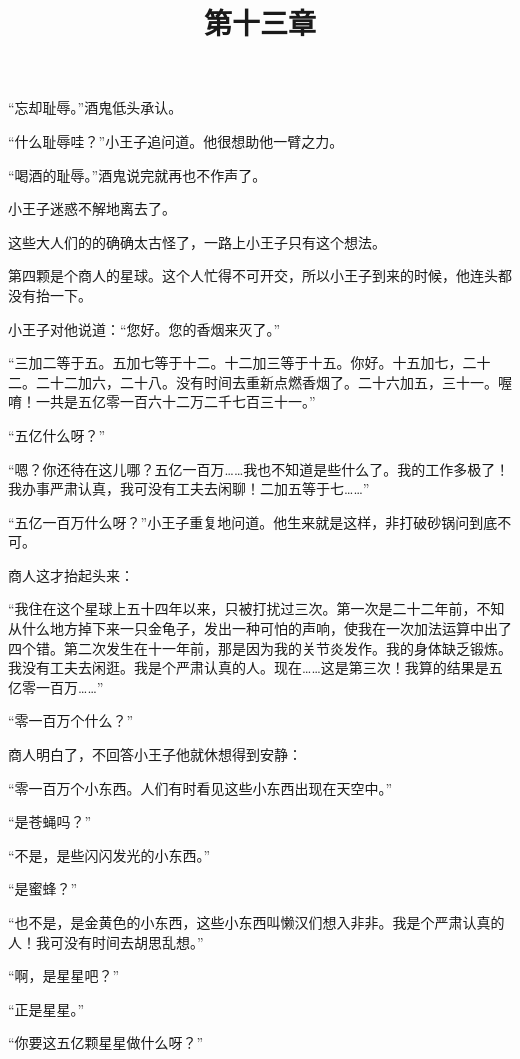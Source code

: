 “忘却耻辱。”酒鬼低头承认。

“什么耻辱哇？”小王子追问道。他很想助他一臂之力。

“喝酒的耻辱。”酒鬼说完就再也不作声了。

小王子迷惑不解地离去了。

这些大人们的的确确太古怪了，一路上小王子只有这个想法。

\title{第十三章}

第四颗是个商人的星球。这个人忙得不可开交，所以小王子到来的时候，他连头都没有抬一下。

{\startalignment[center]
 \stopalignment}

小王子对他说道：“您好。您的香烟来灭了。”

“三加二等于五。五加七等于十二。十二加三等于十五。你好。十五加七，二十二。二十二加六，二十八。没有时间去重新点燃香烟了。二十六加五，三十一。喔唷！一共是五亿零一百六十二万二千七百三十一。”

“五亿什么呀？”

“嗯？你还待在这儿哪？五亿一百万\ldots{}\ldots{}我也不知道是些什么了。我的工作多极了！我办事严肃认真，我可没有工夫去闲聊！二加五等于七\ldots{}\ldots{}”

“五亿一百万什么呀？”小王子重复地问道。他生来就是这样，非打破砂锅问到底不可。

商人这才抬起头来：

“我住在这个星球上五十四年以来，只被打扰过三次。第一次是二十二年前，不知从什么地方掉下来一只金龟子，发出一种可怕的声响，使我在一次加法运算中出了四个错。第二次发生在十一年前，那是因为我的关节炎发作。我的身体缺乏锻炼。我没有工夫去闲逛。我是个严肃认真的人。现在\ldots{}\ldots{}这是第三次！我算的结果是五亿零一百万\ldots{}\ldots{}”

“零一百万个什么？”

商人明白了，不回答小王子他就休想得到安静：

“零一百万个小东西。人们有时看见这些小东西出现在天空中。”

“是苍蝇吗？”

“不是，是些闪闪发光的小东西。”

“是蜜蜂？”

“也不是，是金黄色的小东西，这些小东西叫懒汉们想入非非。我是个严肃认真的人！我可没有时间去胡思乱想。”

“啊，是星星吧？”

“正是星星。”

“你要这五亿颗星星做什么呀？”

